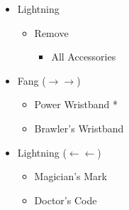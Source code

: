 \begin{paracol}{2}
\begin{menu}
\begin{itemize}
			\equip
			\begin{itemize}
				\item Lightning
				      \begin{itemize}
					      \item Remove
					            \begin{itemize}
						            \item All Accessories
					            \end{itemize}
				      \end{itemize}
				\item Fang ($\rightarrow\rightarrow$)
				      \begin{itemize}
					      \item Power Wristband *
					      \item Brawler's Wristband
				      \end{itemize}
				\item Lightning ($\leftarrow\leftarrow$)
				      \begin{itemize}
					      \item Magician's Mark
					      \item Doctor's Code
				      \end{itemize}
			\end{itemize}
		\end{itemize}


\end{menu}
\end{paracol}
